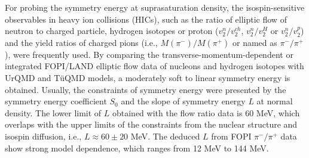 \documentclass[reprint,aps,prc,twocolumn,superscriptaddress]{revtex4-1}
\begin{document}
For probing the symmetry energy at suprasaturation density, the isospin-sensitive observables in heavy ion collisions (HICs), such as the ratio of elliptic flow of neutron to charged particle, hydrogen
isotopes or proton ($v^n_2/v^{ch}_2$, $v^n_2/v^{H}_2$ or $v^n_2/v^{p}_2$)\cite{Russotto2011PLB,Cozma2013PRC,WangYJ2014PRC,Russotto2016PRC,Cozma2018EPJ} and the yield ratios of charged pions (i.e., $M(\pi^-)/M(\pi^+)$ or named as $\pi^-/\pi^+$)\cite{BALi2002PRL,BALi2002NPA,ZGXiao2009PRL,ZQFeng2010PLB,WJXie2013PLB,JH2014PRC,Song15,Cozma2016PLB,YYLiu2021PRC,GCYong2021PRC,SpiRIT2021PRL}, were frequently used. By comparing the transverse-momentum-dependent or integrated FOPI/LAND
elliptic flow data of nucleons and hydrogen isotopes with UrQMD\cite{Russotto2011PLB,WangYJ2014PRC} and T\"uQMD models\cite{Cozma2013PRC}, a moderately soft to linear symmetry energy is obtained\cite{Russotto2016PRC}. Usually, the constraints of symmetry energy were presented by the symmetry energy coefficient $S_0$ and the slope of symmetry energy $L$ at normal density. The lower limit of $L$ obtained with the flow ratio data is $60$ MeV\cite{Wang2020Fronp}, which overlaps with the upper limits of the constraints from the nuclear structure and isospin diffusion, i.e., $L\approx 60\pm 20$ MeV\cite{BALi13,Oertel17,YXZhang2020PRC}. The deduced $L$ from FOPI $\pi^-/\pi^+$ data show strong model dependence\cite{ZGXiao2009PRL,ZQFeng2010PLB,WJXie2013PLB,JH2014PRC,Song15,Cozma2016PLB,YYLiu2021PRC,GJhang20}, which ranges from 12 MeV to 144 MeV.%



\end{document}
